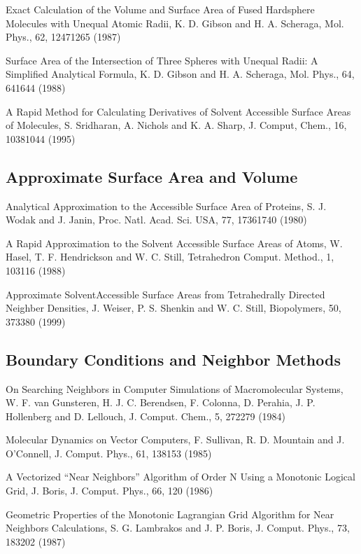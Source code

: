 \documentclass[letterpaper,11pt,english]{sphinxmanual}
\begin{document}
Exact Calculation of the Volume and Surface Area of Fused Hard\sphinxhyphen{}sphere Molecules with Unequal Atomic Radii, K. D. Gibson and H. A. Scheraga, Mol. Phys., 62, 1247\sphinxhyphen{}1265 (1987)

Surface Area of the Intersection of Three Spheres with Unequal Radii: A Simplified Analytical Formula, K. D. Gibson and H. A. Scheraga, Mol. Phys., 64, 641\sphinxhyphen{}644 (1988)

A Rapid Method for Calculating Derivatives of Solvent Accessible Surface Areas of Molecules, S. Sridharan, A. Nichols and K. A. Sharp, J. Comput, Chem., 16, 1038\sphinxhyphen{}1044 (1995)


\subsection{Approximate Surface Area and Volume}
\label{\detokenize{text/references:approximate-surface-area-and-volume}}
Analytical Approximation to the Accessible Surface Area of Proteins, S. J. Wodak and J. Janin, Proc. Natl. Acad. Sci. USA, 77, 1736\sphinxhyphen{}1740 (1980)

A Rapid Approximation to the Solvent Accessible Surface Areas of Atoms, W. Hasel, T. F. Hendrickson and W. C. Still, Tetrahedron Comput. Method., 1, 103\sphinxhyphen{}116 (1988)

Approximate Solvent\sphinxhyphen{}Accessible Surface Areas from Tetrahedrally Directed Neighber Densities, J. Weiser, P. S. Shenkin and W. C. Still, Biopolymers, 50, 373\sphinxhyphen{}380 (1999)


\subsection{Boundary Conditions and Neighbor Methods}
\label{\detokenize{text/references:boundary-conditions-and-neighbor-methods}}
On Searching Neighbors in Computer Simulations of Macromolecular Systems, W. F. van Gunsteren, H. J. C. Berendsen, F. Colonna, D. Perahia, J. P. Hollenberg and D. Lellouch, J. Comput. Chem., 5, 272\sphinxhyphen{}279  (1984)

Molecular Dynamics on Vector Computers, F. Sullivan, R. D. Mountain and J. O’Connell, J. Comput. Phys., 61, 138\sphinxhyphen{}153 (1985)

A Vectorized “Near Neighbors” Algorithm of Order N Using a Monotonic Logical Grid, J. Boris, J. Comput. Phys., 66, 1\sphinxhyphen{}20 (1986)

Geometric Properties of the Monotonic Lagrangian Grid Algorithm for Near Neighbors Calculations, S. G. Lambrakos and J. P. Boris, J. Comput. Phys., 73, 183\sphinxhyphen{}202 (1987)
\end{document}
